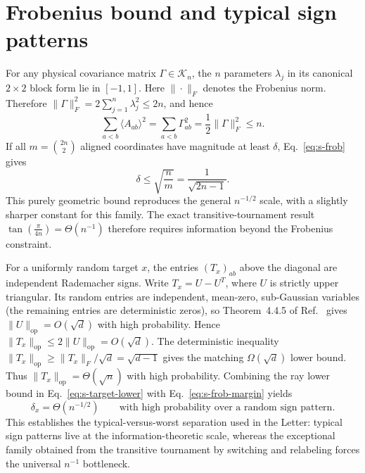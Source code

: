 \documentclass[10pt,aps,pra,twocolumn,superscriptaddress,nofootinbib,longbibliography]{revtex4-2}
\newcommand{\op}{\mathrm{op}}
\newcommand{\calK}{\mathcal{K}}
\begin{document}
{\section{Frobenius bound and typical sign patterns}
\label{supp:typical}
For any physical covariance matrix $\Gamma\in\calK_n$, the $n$ parameters $\lambda_j$ in its canonical $2\times2$ block form lie in $[-1,1]$.  Here $\|\cdot\|_F$ denotes the Frobenius norm.  Therefore $\|\Gamma\|_F^2=2\sum_{j=1}^{n}\lambda_j^2\le2n$, and hence
\begin{equation}
    \sum_{a<b}\langle A_{ab}\rangle^2
    =\sum_{a<b}\Gamma_{ab}^2
    =\frac12\|\Gamma\|_F^2\le n.
    \label{eq:s-frob}
\end{equation}
If all $m=\binom{2n}{2}$ aligned coordinates have magnitude at least $\delta$, Eq.~\eqref{eq:s-frob} gives
\begin{equation}
    \delta\le\sqrt{\frac{n}{m}}=\frac{1}{\sqrt{2n-1}}.
    \label{eq:s-frob-margin}
\end{equation}
This purely geometric bound reproduces the general $n^{-1/2}$ scale, with a slightly sharper constant for this family.  The exact transitive-tournament result $\tan\!\left(\frac{\pi}{4n}\right)=\Theta(n^{-1})$ therefore requires information beyond the Frobenius constraint.

For a uniformly random target $x$, the entries $(T_x)_{ab}$ above the diagonal are independent Rademacher signs.  Write $T_x=U-U^T$, where $U$ is strictly upper triangular.  Its random entries are independent, mean-zero, sub-Gaussian variables (the remaining entries are deterministic zeros), so Theorem~4.4.5 of Ref.~\cite{Vershynin2018HDP} gives $\|U\|_{\op}=O(\sqrt d)$ with high probability.  Hence $\|T_x\|_{\op}\le2\|U\|_{\op}=O(\sqrt d)$.  The deterministic inequality $\|T_x\|_{\op}\ge\|T_x\|_F/\sqrt d=\sqrt{d-1}$ gives the matching $\Omega(\sqrt d)$ lower bound.  Thus $\|T_x\|_{\op}=\Theta(\sqrt n)$ with high probability.  Combining the ray lower bound in Eq.~\eqref{eq:s-target-lower} with Eq.~\eqref{eq:s-frob-margin} yields
\begin{equation}
    \delta_x=\Theta(n^{-1/2})
    \qquad\text{with high probability over a random sign pattern.}
    \label{eq:s-typical}
\end{equation}
This establishes the typical-versus-worst separation used in the Letter: typical sign patterns live at the information-theoretic scale, whereas the exceptional family obtained from the transitive tournament by switching and relabeling forces the universal $n^{-1}$ bottleneck.

}
\end{document}
